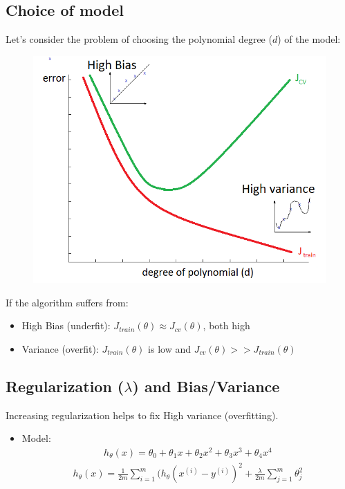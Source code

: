 \documentclass[a4paper,12pt]{report}
\begin{document}
\subsection{Choice of model}
Let's consider the problem of choosing the polynomial degree ($d$) of the model:
\begin{figure}[H]
	\centering
        \includegraphics[totalheight=5 cm]{polydeg.png}
\end{figure}
If the algorithm suffers from:
\begin{itemize}
\item High Bias (underfit): $J_{train}(\theta) \approx J_{cv}(\theta)$, both high
\item Variance (overfit): $J_{train}(\theta)$ is low and $J_{cv}(\theta) >> J_{train}(\theta)$
\end{itemize}
\subsection{Regularization ($\lambda$) and Bias/Variance }
Increasing regularization helps to fix High variance (overfitting).
\begin{itemize}
\item Model:
\begin{align}
h_{\theta}(x) = \theta_0 + \theta_1 x + \theta_2 x^2 + \theta_3 x^3 + \theta_4 x^4 
\end{align}
\begin{align}
h_{\theta}(x) = \frac{1}{2m} \sum_{i=1} ^{m} (h_{\theta}(x^{(i)}-y^{(i)})^2 + \frac{\lambda}{2m} \sum_{j=1} ^m \theta_j ^2
\end{align}
\end{itemize}
\end{document}
